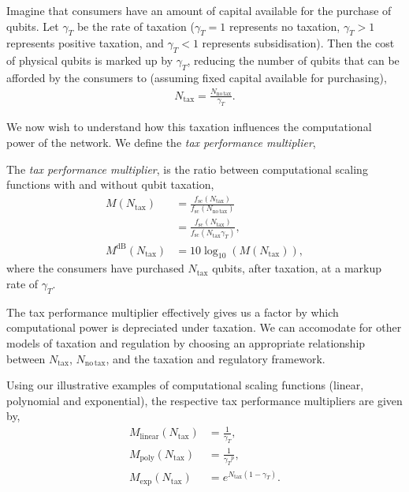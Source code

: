 Imagine that consumers have an amount of capital available for the purchase of qubits. Let $\gamma_T$ be the rate of taxation (\mbox{$\gamma_T=1$} represents no taxation, \mbox{$\gamma_T>1$} represents positive taxation, and \mbox{$\gamma_T<1$} represents subsidisation). Then the cost of physical qubits is marked up by $\gamma_T$, reducing the number of qubits that can be afforded by the consumers to (assuming fixed capital available for purchasing),
\begin{align}
	N_\mathrm{tax} = \frac{N_\mathrm{no\,tax}}{\gamma_T}.
\end{align}

We now wish to understand how this taxation influences the computational power of the network. We define the \textit{tax performance multiplier},
\begin{definition}
The \textit{tax performance multiplier}, is the ratio between computational scaling functions with and without qubit taxation,
\begin{align}
M(N_\mathrm{tax}) &= \frac{f_\mathrm{sc}(N_\mathrm{tax})}{f_\mathrm{sc}(N_\mathrm{no\,tax})} \nonumber \\
&= \frac{f_\mathrm{sc}(N_\mathrm{tax})}{f_\mathrm{sc}(N_\mathrm{tax} \gamma_T)},\nonumber\\
M^\mathrm{dB}(N_\mathrm{tax}) &= 10\log_{10}(M(N_\mathrm{tax})),
\end{align}
where the consumers have purchased $N_\mathrm{tax}$ qubits, after taxation, at a markup rate of $\gamma_T$.
\end{definition}
The tax performance multiplier effectively gives us a factor by which computational power is depreciated under taxation. We can accomodate for other models of taxation and regulation by choosing an appropriate relationship between $N_\mathrm{tax}$, $N_\mathrm{no\,tax}$, and the taxation and regulatory framework.

Using our illustrative examples of computational scaling functions (linear, polynomial and exponential), the respective tax performance multipliers are given by,
\begin{align}
M_\mathrm{linear}(N_\mathrm{tax}) &= \frac{1}{\gamma_T}, \nonumber \\
M_\mathrm{poly}(N_\mathrm{tax}) &= \frac{1}{{\gamma_T}^p}, \nonumber \\
M_\mathrm{exp} (N_\mathrm{tax}) &= e^{N_\mathrm{tax}(1-\gamma_T)}.
\end{align}

